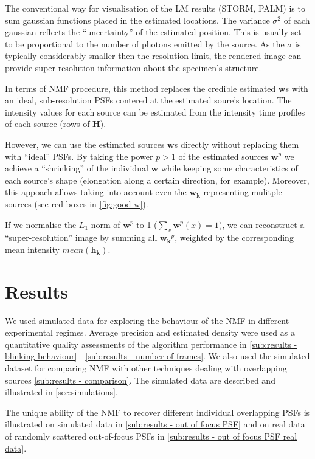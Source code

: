 The conventional way for visualisation of the LM results (STORM, PALM) is to sum gaussian functions placed in the estimated locations. The variance $\sigma^{2}$ of each gaussian reflects the ``uncertainty'' of the estimated position. This is usually set to be proportional to the number of photons emitted by the source. As the $\sigma$ is typically considerably smaller then the resolution limit, the rendered image can provide super-resolution information about the specimen's structure. 
	
In terms of NMF procedure, this method replaces the credible estimated $\bm{w}$s with an ideal, sub-resolution PSFs contered at the estimated soure's location. The intensity values for each source can be estimated from the intensity time profiles of each source (rows of $\bm{H}$). 

However, we can use the estimated sources $\bm{w}$s directly without replacing them with ``ideal'' PSFs. By taking the power $p>1$ of the estimated sources $\bm{w}^{p}$ we achieve a ``shrinking'' of the individual $\bm{w}$ while keeping some characteristics of each source's shape (elongation along a certain direction, for example). Moreover, this appoach allows taking into account even the $\bm{w_{k}}$ representing mulitple sources (see red boxes in \autoref{fig:good w}).

If we normalise the $L_{1}$ norm of $\bm{w}^{p}$ to 1 ($\sum_{x} \bm{w}^{p}(x)=1$), we can reconstruct a ``super-resolution'' image by summing all $\bm{w_{k}}^{p}$, weighted by the corresponding mean intensity $\unit{mean}(\bm{h_{k}})$.

\clearpage
\section{Results \label{sec:results}}
We used simulated data for exploring the behaviour of the NMF in different experimental regimes. Average precision and estimated density were used as a quantitative quality assessments of the algorithm performance in  \autoref{sub:results - blinking behaviour} - \ref{sub:results - number of frames}. We also used the simulated dataset for comparing NMF with other techniques dealing with overlapping sources \autoref{sub:results - comparison}. The simulated data are described and illustrated in \autoref{sec:simulations}. 

The unique ability of the NMF to recover different individual overlapping PSFs is illustrated on simulated data in \autoref{sub:results - out of focus PSF} and on real data of randomly scattered out-of-focus PSFs in \autoref{sub:results - out of focus PSF real data}.

